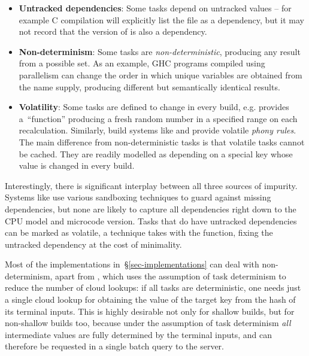 \begin{itemize}
\item \textbf{Untracked dependencies}: Some tasks depend on untracked values --
      for example C compilation will explicitly list the  file as
      a dependency, but it may not record that the version of  is also
      a dependency.

\item \textbf{Non-determinism}: Some tasks are \emph{non-deterministic},
      producing any result from a possible set. As an example, GHC programs
      compiled using parallelism can change the order in which unique variables
      are obtained from the name supply, producing different but semantically
      identical results.

\item \textbf{Volatility}: Some tasks are defined to change in every build, e.g.
      \Excel provides a~``function''  producing a fresh random
      number in a specified range on each recalculation. Similarly, build
      systems like \Make and \Shake provide volatile \emph{phony rules}. The
      main difference from non-deterministic tasks is that volatile tasks cannot
      be cached. They are readily modelled as depending on a special key
       whose value is changed in every build.
\end{itemize}

Interestingly, there is significant interplay between all three sources of
impurity. Systems like \Bazel use various sandboxing techniques to guard against
missing dependencies, but none are likely to capture all dependencies right down
to the CPU model and microcode version. Tasks that do have untracked
dependencies can be marked as volatile, a technique \Excel takes with the
 function, fixing the untracked dependency at the cost of
minimality.

Most of the implementations in~\S\ref{sec-implementations} can deal with
non-determinism, apart from \Buck, which uses the assumption of task determinism
to reduce the number of cloud lookups: if all tasks are deterministic, one needs
just a single cloud lookup for obtaining the value of the target key from the
hash of its terminal inputs. This is highly desirable not only for shallow
builds, but for non-shallow builds too, because under the assumption of task
determinism \emph{all} intermediate values are fully determined by the terminal
inputs, and can therefore be requested in a single batch query to the server.

